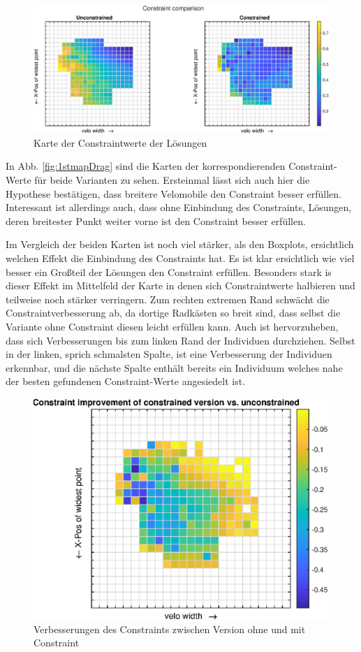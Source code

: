 \begin{figure}[h]
	\includegraphics[width=1\linewidth]{bilder/2pt500Samples/constraintMapComparison}
	\caption{Karte der Constraintwerte der Lösungen}
	\label{fig:1stmapCon}
\end{figure}

In Abb. \cref{fig:1stmapDrag} sind die Karten der korrespondierenden Constraint-Werte für beide Varianten zu sehen.
Ersteinmal lässt sich auch hier die Hypothese bestätigen, dass breitere Velomobile den Constraint besser erfüllen.
Interessant ist allerdings auch, dass ohne Einbindung des Constraints, Lösungen, deren breitester Punkt weiter vorne ist den Constraint besser erfüllen.

Im Vergleich der beiden Karten ist noch viel stärker, als den Boxplots, ersichtlich welchen Effekt die Einbindung des Constraints hat.
Es ist klar ersichtlich wie viel besser ein Großteil der Lösungen den Constraint erfüllen.
Besonders stark is dieser Effekt im Mittelfeld der Karte in denen sich Constraintwerte halbieren und teilweise noch stärker verringern.
Zum rechten extremen Rand schwächt die Constraintverbesserung ab, da dortige Radkästen so breit sind, dass selbst die Variante ohne Constraint diesen leicht erfüllen kann.
Auch ist hervorzuheben, dass sich Verbesserungen bis zum linken Rand der Individuen durchziehen.
Selbst in der linken, sprich schmalsten Spalte, ist eine Verbesserung der Individuen erkennbar, und die nächste Spalte enthält bereits ein Individuum welches nahe der besten gefundenen Constraint-Werte angesiedelt ist.

\begin{figure}[h]
	\centering
	\includegraphics[width=.7\linewidth]{bilder/2pt500Samples/constraintImprovements}
	\caption{Verbesserungen des Constraints zwischen Version ohne und mit Constraint}
	\label{fig:1stmapConCompare}
\end{figure}


